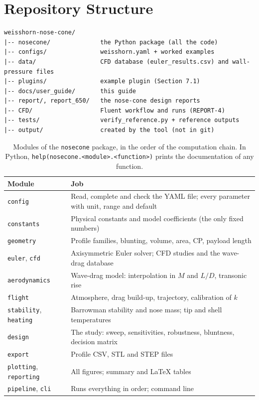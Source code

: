 \section{Repository Structure}
\label{sec:structure}

\begin{lstlisting}[language={}]
weisshorn-nose-cone/
|-- nosecone/              the Python package (all the code)
|-- configs/               weisshorn.yaml + worked examples
|-- data/                  CFD database (euler_results.csv) and wall-pressure files
|-- plugins/               example plugin (Section 7.1)
|-- docs/user_guide/       this guide
|-- report/, report_650/   the nose-cone design reports
|-- CFD/                   Fluent workflow and runs (REPORT-4)
|-- tests/                 verify_reference.py + reference outputs
|-- output/                created by the tool (not in git)
\end{lstlisting}

\begin{table}[H]
\centering
\caption{Modules of the \texttt{nosecone} package, in the order of the computation chain. In Python,
\texttt{help(nosecone.<module>.<function>)} prints the documentation of any function.}
\label{tab:modules}
\footnotesize
\begin{tabular}{@{}>{\raggedright\arraybackslash}p{2.6cm}>{\raggedright\arraybackslash}p{13.4cm}@{}}
\toprule
Module & Job \\
\midrule
\texttt{config} & Read, complete and check the YAML file; every parameter with unit, range and default \\
\texttt{constants} & Physical constants and model coefficients (the only fixed numbers) \\
\texttt{geometry} & Profile families, blunting, volume, area, CP, payload length \\
\texttt{euler}, \texttt{cfd} & Axisymmetric Euler solver; CFD studies and the wave-drag database \\
\texttt{aerodynamics} & Wave-drag model: interpolation in $M$ and $L/D$, transonic rise \\
\texttt{flight} & Atmosphere, drag build-up, trajectory, calibration of $k$ \\
\texttt{stability}, \texttt{heating} & Barrowman stability and nose mass; tip and shell temperatures \\
\texttt{design} & The study: sweep, sensitivities, robustness, bluntness, decision matrix \\
\texttt{export} & Profile CSV, STL and STEP files \\
\texttt{plotting}, \texttt{reporting} & All figures; summary and LaTeX tables \\
\texttt{pipeline}, \texttt{cli} & Runs everything in order; command line \\
\bottomrule
\end{tabular}
\end{table}
